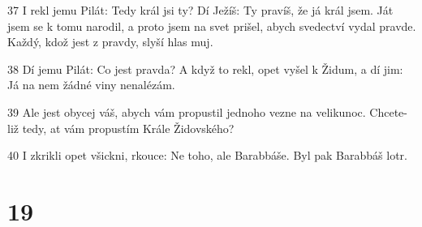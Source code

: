\par 37 I rekl jemu Pilát: Tedy král jsi ty? Dí Ježíš: Ty pravíš, že já král jsem. Ját jsem se k tomu narodil, a proto jsem na svet prišel, abych svedectví vydal pravde. Každý, kdož jest z pravdy, slyší hlas muj.
\par 38 Dí jemu Pilát: Co jest pravda? A když to rekl, opet vyšel k Židum, a dí jim: Já na nem žádné viny nenalézám.
\par 39 Ale jest obycej váš, abych vám propustil jednoho vezne na velikunoc. Chcete-liž tedy, at vám propustím Krále Židovského?
\par 40 I zkrikli opet všickni, rkouce: Ne toho, ale Barabbáše. Byl pak Barabbáš lotr.

\chapter{19}

